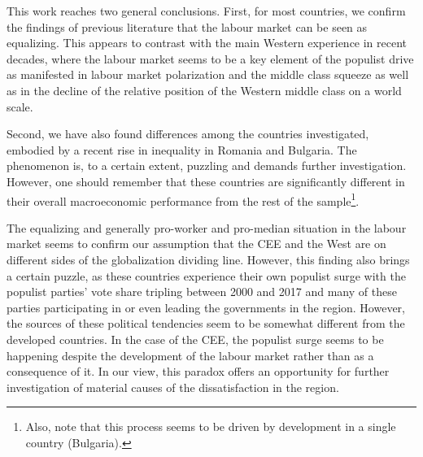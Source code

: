 \documentclass{article}
\begin{document}
This work reaches two general conclusions. First, for most countries, we confirm the findings of previous literature that the labour market can be seen as equalizing. This appears to contrast with the main Western experience in recent decades, where the labour market seems to be a key element of the populist drive as manifested in labour market polarization and the middle class squeeze as well as in the decline of the relative position of the Western middle class on a world scale.

Second, we have also found differences among the countries investigated, embodied by a recent rise in inequality in Romania and Bulgaria. The phenomenon is, to a certain extent, puzzling and demands further investigation. However, one should remember that these countries are significantly different in their overall macroeconomic performance from the rest of the sample\footnote{
Also, note that this process seems to be driven by development in a single country (Bulgaria).}.

The equalizing and generally pro-worker and pro-median situation in the labour market seems to confirm our assumption that the CEE and the West are on different sides of the globalization dividing line. However, this finding also brings a certain puzzle, as these countries experience their own populist surge with the populist parties' vote share tripling between 2000 and 2017 and many of these parties participating in or even leading the governments in the region. However, the sources of these political tendencies seem to be somewhat different from the developed countries. In the case of the CEE, the populist surge seems to be happening despite the development of the labour market rather than as a consequence of it. In our view, this paradox offers an opportunity for further investigation of material causes of the dissatisfaction in the region.













\newpage
\end{document}
